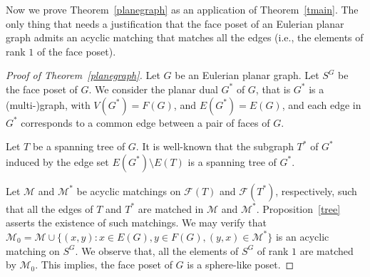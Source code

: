 \documentclass[12pt]{article}
\theoremstyle{definition}
\theoremstyle{remark}
\newcommand{\M}{\mathcal{M}}
\begin{document}
	    Now we prove Theorem~\ref{planegraph} as an application of Theorem~\ref{tmain}. The only thing that needs a justification that the face poset of an Eulerian planar graph admits an acyclic matching that matches all the edges (i.e., the elements of rank $1$ of the face poset). 
	    \begin{proof}[Proof of Theorem~\ref{planegraph}]
	    Let $G$ be an Eulerian planar graph. Let $S^G$ be the face poset of $G$. We consider the planar dual $G^*$ of $G$, that is $G^*$ is a (multi-)graph, with $V(G^*)=F(G)$, and $E(G^*)=E(G)$, and each edge in $G^*$ corresponds to a common edge between a pair of faces of $G$.
	    
	    Let $T$ be a spanning tree of $G$. It is well-known that the subgraph $T^*$ of $G^*$ induced by the edge set $E(G^*)\setminus E(T)$ is a spanning tree of $G^*$.
	    
	    Let $\M$ and $\M^*$ be acyclic matchings on $\mathcal{F}(T)$ and $\mathcal{F}(T^*)$, respectively, such that all the edges of $T$ and $T^*$ are matched in $\M$ and $\M^*$. Proposition~\ref{tree} asserts the existence of such matchings. We may verify that $\M_0= \M \cup \{(x,y): x\in E(G), y \in F(G), (y,x)\in \M^*\}$ is an acyclic matching on $S^G$.  We observe that, all the elements of $S^G$ of rank $1$ are matched by $\M_0$. This implies, the face poset of $G$ is a sphere-like poset.
	    \end{proof}
	    
	    

	
	
\end{document}
